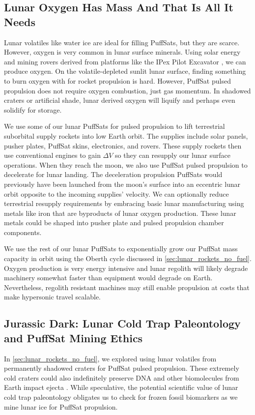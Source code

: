 \documentclass{article}
\begin{document}
{\subsection{Lunar Oxygen Has Mass And That Is All It Needs}\label{sec:lunar_mining}
Lunar volatiles like water ice are ideal for filling PuffSats, but they are scarce.   However, oxygen is very common in lunar surface minerals.   Using solar energy and mining rovers derived from platforms like the IPex Pilot Excavator \cite{ipex_pilot_excavator}, we can produce oxygen.  On the volatile-depleted sunlit lunar surface, finding something to burn oxygen with for rocket propulsion is hard.   However, PuffSat pulsed propulsion does not require oxygen combustion, just gas momentum.  In shadowed craters or artificial shade, lunar derived oxygen will liquify and perhaps even solidify for storage.  

We use some of our lunar PuffSats for pulsed propulsion to lift terrestrial suborbital supply rockets into low Earth orbit.  The supplies include solar panels, pusher plates, PuffSat skins, electronics, and rovers. These supply rockets then use conventional engines to gain \(\Delta V\) so they can resupply our lunar surface operations.   When they reach the moon, we also use PuffSat pulsed propulsion to decelerate for lunar landing.  The deceleration propulsion PuffSats would previously have been launched from the moon's surface into an eccentric lunar orbit opposite to the incoming supplies' velocity.   We can optionally reduce terrestrial resupply requirements by embracing basic lunar manufacturing using metals like iron that are byproducts of lunar oxygen production.  These lunar metals could be shaped into pusher plate and pulsed propulsion chamber components.  

We use the rest of our lunar PuffSats to exponentially grow our PuffSat mass capacity in orbit using the Oberth cycle discussed in \autoref{sec:lunar_rockets_no_fuel}.  Oxygen production is very energy intensive and lunar regolith will likely degrade machinery somewhat faster than equipment would degrade on Earth.  Nevertheless, regolith resistant machines  may still enable propulsion at costs that make hypersonic travel scalable.

\subsection{Jurassic Dark: Lunar Cold Trap Paleontology and PuffSat Mining Ethics}\label{sec:jurassic_dark}
In \autoref{sec:lunar_rockets_no_fuel}, we explored using lunar volatiles from permanently shadowed craters for PuffSat pulsed propulsion. These extremely cold craters could also indefinitely preserve DNA and other biomolecules from Earth impact ejecta \cite{dino_dna}. While speculative, the potential scientific value of lunar cold trap paleontology obligates us to check for frozen fossil biomarkers as we mine lunar ice for PuffSat propulsion.

}
\end{document}
